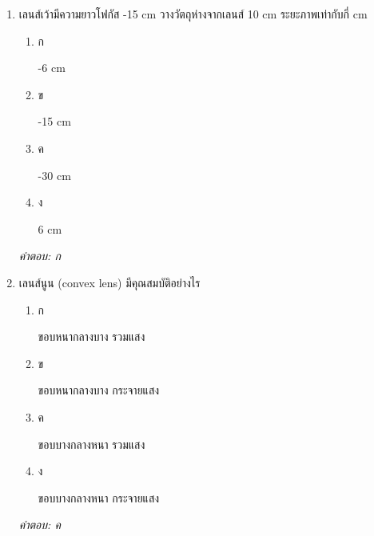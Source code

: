 \documentclass[12pt]{article}
\begin{document}
\begin{enumerate}[label=\arabic*., itemsep=0.5\baselineskip, topsep=0.5\baselineskip, leftmargin=*]
\item เลนส์เว้ามีความยาวโฟกัส -15 cm วางวัตถุห่างจากเลนส์ 10 cm ระยะภาพเท่ากับกี่ cm
\begin{enumerate}[label=\alph*)., itemsep=0.3\baselineskip, topsep=0.3\baselineskip]
\item ก\ 
\begin{minipage}[t]{0.9\linewidth}
\raggedright -6 cm
\end{minipage}
\item ข\ 
\begin{minipage}[t]{0.9\linewidth}
\raggedright -15 cm
\end{minipage}
\item ค\ 
\begin{minipage}[t]{0.9\linewidth}
\raggedright -30 cm
\end{minipage}
\item ง\ 
\begin{minipage}[t]{0.9\linewidth}
\raggedright 6 cm
\end{minipage}
\end{enumerate}
\vspace{-0.3\baselineskip}
\begin{small}
\textit{คำตอบ: ก}
\end{small}

\item เลนส์นูน (convex lens) มีคุณสมบัติอย่างไร
\begin{enumerate}[label=\alph*)., itemsep=0.3\baselineskip, topsep=0.3\baselineskip]
\item ก\ 
\begin{minipage}[t]{0.9\linewidth}
\raggedright ขอบหนากลางบาง รวมแสง
\end{minipage}
\item ข\ 
\begin{minipage}[t]{0.9\linewidth}
\raggedright ขอบหนากลางบาง กระจายแสง
\end{minipage}
\item ค\ 
\begin{minipage}[t]{0.9\linewidth}
\raggedright ขอบบางกลางหนา รวมแสง
\end{minipage}
\item ง\ 
\begin{minipage}[t]{0.9\linewidth}
\raggedright ขอบบางกลางหนา กระจายแสง
\end{minipage}
\end{enumerate}
\vspace{-0.3\baselineskip}
\begin{small}
\textit{คำตอบ: ค}
\end{small}


\end{enumerate}
\end{document}

